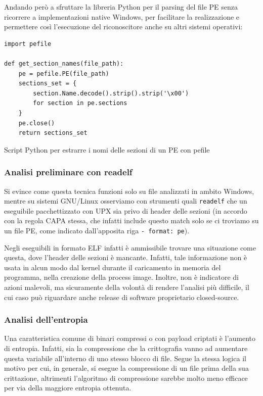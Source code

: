\bigskip

Andando però a sfruttare la libreria Python per il parsing del file PE senza ricorrere a implementazioni native Windows, per facilitare la realizzazione e permettere così l'esecuzione del riconoscitore anche su altri sistemi operativi:

\begin{code}
\begin{verbatim}
import pefile

def get_section_names(file_path):
    pe = pefile.PE(file_path)
    sections_set = {
        section.Name.decode().strip().strip('\x00')
        for section in pe.sections
    }
    pe.close()
    return sections_set
\end{verbatim}
\label{lst:pe_naive_section_names_extraction}
\caption{Script Python per estrarre i nomi delle sezioni di un PE con pefile}
\end{code}

\subsubsection{Analisi preliminare con readelf}
Si evince come questa tecnica funzioni solo su file analizzati in ambito Windows, mentre su sistemi GNU/Linux osserviamo con strumenti quali \texttt{readelf} che un eseguibile pacchettizzato con UPX sia privo di header delle sezioni
(in accordo con la regola CAPA stessa, che infatti include questo match solo se ci troviamo su un file PE, come indicato dall'apposita riga \texttt{- format: pe}).

Negli eseguibili in formato ELF infatti è ammissibile trovare una situazione come questa, dove l'header delle sezioni è mancante. Infatti, tale informazione non è usata in alcun modo dal kernel durante il caricamento in memoria del programma, nella creazione della process image. Inoltre, non è indicatore di azioni malevoli, ma sicuramente della volontà di rendere l'analisi più difficile, il cui caso può riguardare anche release di software proprietario closed-source.

\subsubsection{Analisi dell'entropia}
Una caratteristica comune di binari compressi o con payload criptati è l'aumento di entropia. Infatti, sia la compressione che la crittografia vanno ad aumentare questa variabile all'interno di uno stesso blocco di file. Segue la stessa logica il motivo per cui, in generale, si esegue la compressione di un file prima della sua crittazione, altrimenti l'algoritmo di compressione sarebbe molto meno efficace per via della maggiore entropia ottenuta.

